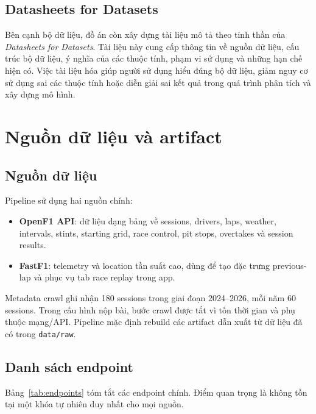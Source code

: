 \documentclass[conference]{IEEEtran}
\begin{document}
\subsection{Datasheets for Datasets}
Bên cạnh bộ dữ liệu, đồ án còn xây dựng tài liệu mô tả theo tinh thần của \emph{Datasheets for Datasets}. Tài liệu này cung cấp thông tin về nguồn dữ liệu, cấu trúc bộ dữ liệu, ý nghĩa của các thuộc tính, phạm vi sử dụng và những hạn chế hiện có. Việc tài liệu hóa giúp người sử dụng hiểu đúng bộ dữ liệu, giảm nguy cơ sử dụng sai các thuộc tính hoặc diễn giải sai kết quả trong quá trình phân tích và xây dựng mô hình.

\section{Nguồn dữ liệu và artifact}
\subsection{Nguồn dữ liệu}
Pipeline sử dụng hai nguồn chính:

\begin{itemize}
    \item \textbf{OpenF1 API}: dữ liệu dạng bảng về sessions, drivers, laps, weather, intervals, stints, starting grid, race control, pit stops, overtakes và session results.
    \item \textbf{FastF1}: telemetry và location tần suất cao, dùng để tạo đặc trưng previous-lap và phục vụ tab race replay trong app.
\end{itemize}

Metadata crawl ghi nhận 180 sessions trong giai đoạn 2024--2026, mỗi năm 60 sessions. Trong cấu hình nộp bài, bước crawl được tắt vì tốn thời gian và phụ thuộc mạng/API. Pipeline mặc định rebuild các artifact dẫn xuất từ dữ liệu đã có trong \texttt{data/raw}.

\subsection{Danh sách endpoint}
Bảng~\ref{tab:endpoints} tóm tắt các endpoint chính. Điểm quan trọng là không tồn tại một khóa tự nhiên duy nhất cho mọi nguồn.
\end{document}
